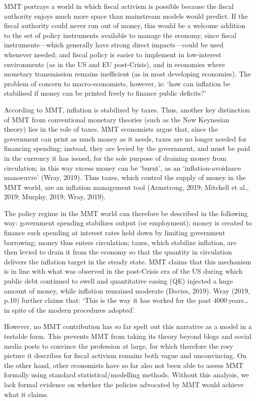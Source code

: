 \documentclass[10pt,a4paper]{article}
\begin{document}
MMT portrays a world in which fiscal activism is possible because the fiscal authority enjoys much more space than mainstream models would predict. If the fiscal authority could never run out of money, this would be a welcome addition to the set of policy instruments available to manage the economy, since fiscal instruments—which generally have strong direct impacts—could be used whenever needed; and fiscal policy is easier to implement in low-interest environments (as in the US and EU post-Crisis), and in economies where monetary transmission remains inefficient (as in most developing economies). The problem of concern to macro-economists, however, is: ‘how can inflation be stabilised if money can be printed freely to finance public deficits?’

According to MMT, inflation is stabilized by taxes. Thus, another key distinction of MMT from conventional monetary theories (such as the New Keynesian theory) lies in the role of taxes. MMT economists argue that, since the government can print as much money as it needs, taxes are no longer needed for financing spending; instead, they are levied by the government, and must be paid in the currency it has issued, for the sole purpose of draining money from circulation; in this way excess money can be ‘burnt’, as an ‘inflation-avoidance manoeuvre’ (Wray, 2019). Thus taxes, which control the supply of money in the MMT world, are an inflation management tool (Armstrong, 2019; Mitchell et al., 2019; Murphy, 2019; Wray, 2019).

The policy regime in the MMT world can therefore be described in the following way: government spending stabilizes output (or employment); money is created to finance such spending at interest rates held down by limiting government borrowing; money thus enters circulation; taxes, which stabilize inflation, are then levied to drain it from the economy so that the quantity in circulation delivers the inflation target in the steady state. MMT claims that this mechanism is in line with what was observed in the post-Crisis era of the US during which public debt continued to swell and quantitative easing (QE) injected a huge amount of money, while inflation remained moderate (Davies, 2019). Wray (2019, p.10) further claims that: ‘This is the way it has worked for the past 4000 years… in spite of the modern procedures adopted’.

However, no MMT contribution has so far spelt out this narrative as a model in a testable form. This prevents MMT from taking its theory beyond blogs and social media posts to convince the profession at large, for which therefore the rosy picture it describes for fiscal activism remains both vague and unconvincing. On the other hand, other economists have so far also not been able to assess MMT formally using standard statistical/modelling methods. Without this analysis, we lack formal evidence on whether the policies advocated by MMT would achieve what it claims.
\end{document}
